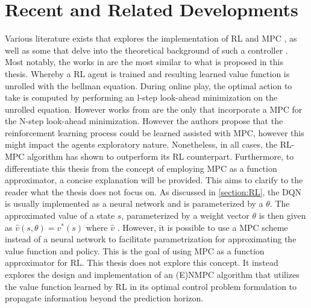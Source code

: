 \section{Recent and Related Developments}
Various literature exists that explores the implementation of RL and MPC ,\cite{arroyoReinforcedModelPredictive2022,beckenbachAddressingInfinitehorizonOptimization2018,lubarsCombiningReinforcementLearning2021,lubbersAutonomousGreenhouseClimate2023,sikchiLearningOffPolicyOnline2021,} as well as some that delve into the theoretical background of such a controller \cite{beckenbachAddressingInfinitehorizonOptimization2018,bertsekasLessonsAlphaZeroOptimal,bertsekasNewtonMethodReinforcement2022,linReinforcementLearningBasedModel2023}.
Most notably, the works in \cite{sikchiLearningOffPolicyOnline2021,arroyoReinforcedModelPredictive2022,linReinforcementLearningBasedModel2023,bertsekasLessonsAlphaZeroOptimal} are the most similar to what is proposed in this thesis. Whereby a RL agent is trained and resulting learned value function is unrolled with the bellman equation. During online play, the optimal action to take is computed by performing an l-step look-ahead minimization on the unrolled equation. However works from \cite{arroyoReinforcedModelPredictive2022,linReinforcementLearningBasedModel2023,beckenbachAddressingInfinitehorizonOptimization2018} are the only that incorporate a MPC for the N-step look-ahead minimization. However the authors propose that the reinforcement learning process could be learned assisted with MPC, however this might impact the agents exploratory nature. Nonetheless, in all cases, the RL-MPC algorithm has shown to outperform its RL counterpart. Furthermore, to differentiate this thesis from the concept of employing MPC as a function approximator, a concise explanation will be provided. This aims to clarify to the reader what the thesis does not focus on. As discussed in \autoref{section:RL}, the DQN is usually implemented as a neural network and is parameterized by a ${\theta}$. The approximated value of a state $s$, parameterized by a weight vector  $\theta$ is then given as $ \hat{v}(s,\theta) = v^*(s)$ where $\hat{v}$ \cite{lubbersAutonomousGreenhouseClimate2023}. However, it is possible to use a MPC scheme instead of a neural network to facilitate parametrization for approximating the value function and policy. This is the goal of using MPC as a function approximator for RL. This thesis does not explore this concept. It instead explores the design and implementation of an (E)NMPC algorithm that utilizes the value function learned by RL in its optimal control problem formulation to propagate information beyond the prediction horizon. 




